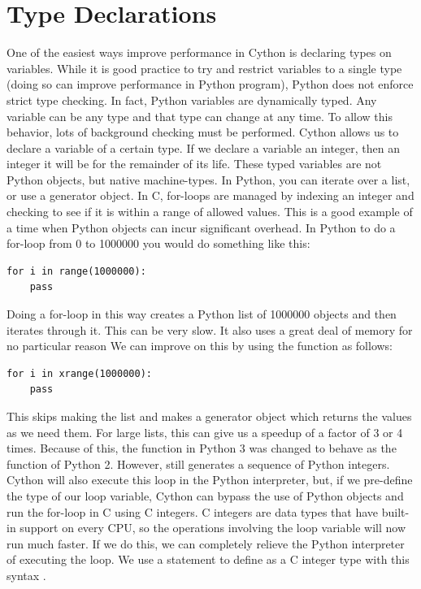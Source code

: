 \section*{Type Declarations}
One of the easiest ways improve performance in Cython is declaring types on variables.
While it is good practice to try and restrict variables to a single type (doing so can improve performance in Python program),
Python does not enforce strict type checking.  In fact, Python variables are dynamically typed.
Any variable can be any type and that type can change at any time.
To allow this behavior, lots of background checking must be performed.
Cython allows us to declare a variable of a certain type.  If we declare a variable an integer, then an integer it will be for the remainder of its life.
These typed variables are not Python objects, but native machine-types.
In Python, you can iterate over a list, or use a generator object.
In C, for-loops are managed by indexing an integer and checking to see if it is within a range of allowed values.
This is a good example of a time when Python objects can incur significant overhead.
In Python to do a for-loop from 0 to 1000000 you would do something like this:
\begin{lstlisting}
for i in range(1000000):
    pass
\end{lstlisting}
Doing a for-loop in this way creates a Python list of 1000000 objects and then iterates through it.
This can  be very slow.
It also uses a great deal of memory for no particular reason
We can improve on this by using the  function as follows:
\begin{lstlisting}
for i in xrange(1000000):
    pass
\end{lstlisting}
This skips making the list and makes a generator object which returns the values as we need them.
For large lists, this can give us a speedup of a factor of 3 or 4 times.
Because of this, the  function in Python 3 was changed to behave as the  function of Python 2.
However,  still generates a sequence of Python integers.
Cython will also execute this loop in the Python interpreter, but, if we pre-define the type of our loop variable, Cython can bypass the use of Python objects and run the for-loop in C using C integers.
C integers are data types that have built-in support on every CPU, so the operations involving the loop variable will now run much faster.
If we do this, we can completely relieve the Python interpreter of executing the loop.
We use a  statement to define  as a C integer type with this syntax .
